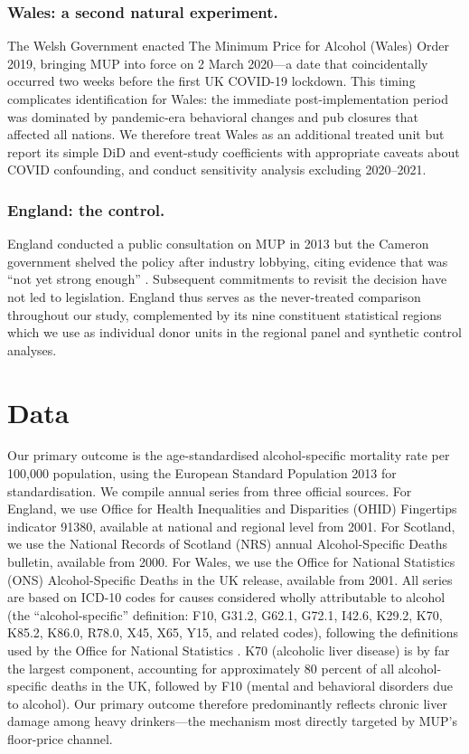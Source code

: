 \documentclass[12pt]{article}
\begin{document}
\subsubsection*{Wales: a second natural experiment.} The Welsh Government enacted The Minimum Price for Alcohol (Wales) Order 2019, bringing MUP into force on 2 March 2020---a date that coincidentally occurred two weeks before the first UK COVID-19 lockdown. This timing complicates identification for Wales: the immediate post-implementation period was dominated by pandemic-era behavioral changes and pub closures that affected all nations. We therefore treat Wales as an additional treated unit but report its simple DiD and event-study coefficients with appropriate caveats about COVID confounding, and conduct sensitivity analysis excluding 2020--2021.

\subsubsection*{England: the control.} England conducted a public consultation on MUP in 2013 but the Cameron government shelved the policy after industry lobbying, citing evidence that was ``not yet strong enough'' \citep{HMGov2013}. Subsequent commitments to revisit the decision have not led to legislation. England thus serves as the never-treated comparison throughout our study, complemented by its nine constituent statistical regions which we use as individual donor units in the regional panel and synthetic control analyses.

\section{Data}
\label{sec:data}

Our primary outcome is the age-standardised alcohol-specific mortality rate per 100,000 population, using the European Standard Population 2013 for standardisation. We compile annual series from three official sources. For England, we use Office for Health Inequalities and Disparities (OHID) Fingertips indicator 91380, available at national and regional level from 2001. For Scotland, we use the National Records of Scotland (NRS) annual Alcohol-Specific Deaths bulletin, available from 2000. For Wales, we use the Office for National Statistics (ONS) Alcohol-Specific Deaths in the UK release, available from 2001. All series are based on ICD-10 codes for causes considered wholly attributable to alcohol (the ``alcohol-specific'' definition: F10, G31.2, G62.1, G72.1, I42.6, K29.2, K70, K85.2, K86.0, R78.0, X45, X65, Y15, and related codes), following the definitions used by the Office for National Statistics \citep{ONS2023}. K70 (alcoholic liver disease) is by far the largest component, accounting for approximately 80 percent of all alcohol-specific deaths in the UK, followed by F10 (mental and behavioral disorders due to alcohol). Our primary outcome therefore predominantly reflects chronic liver damage among heavy drinkers---the mechanism most directly targeted by MUP's floor-price channel.
\end{document}
